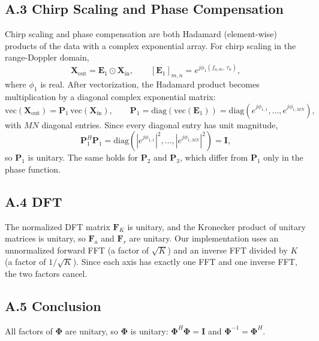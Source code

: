 \documentclass[12pt]{article}
\begin{document}
\subsection*{A.3 Chirp Scaling and Phase Compensation}
Chirp scaling and phase compensation are both Hadamard (element-wise)
products of the data with a complex exponential array. For chirp scaling in
the range-Doppler domain,
\begin{equation*}
  \mathbf{X}_{\mathrm{out}} = \mathbf{E}_{1} \odot \mathbf{X}_{\mathrm{in}},
  \qquad [\mathbf{E}_{1}]_{m,n} = e^{j\phi_{1}(f_{a,m},\,\tau_{n})},
\end{equation*}
where $\phi_{1}$ is real. After vectorization, the Hadamard product becomes
multiplication by a diagonal complex exponential matrix:
\begin{equation*}
  \mathrm{vec}(\mathbf{X}_{\mathrm{out}})
    = \mathbf{P}_{1}\,\mathrm{vec}(\mathbf{X}_{\mathrm{in}}),
  \qquad
  \mathbf{P}_{1} = \mathrm{diag}\!\left(\mathrm{vec}(\mathbf{E}_{1})\right)
    = \mathrm{diag}\!\left(e^{j\phi_{1,1}}, \dots, e^{j\phi_{1,MN}}\right),
\end{equation*}
with $MN$ diagonal entries. Since every diagonal entry has unit magnitude,
\begin{equation*}
  \mathbf{P}_{1}^{H}\mathbf{P}_{1}
    = \mathrm{diag}\!\left(|e^{j\phi_{1,1}}|^{2}, \dots,
                           |e^{j\phi_{1,MN}}|^{2}\right)
    = \mathbf{I},
\end{equation*}
so $\mathbf{P}_{1}$ is unitary. The same holds for $\mathbf{P}_{2}$ and
$\mathbf{P}_{3}$, which differ from $\mathbf{P}_{1}$ only in the phase
function.

\subsection*{A.4 DFT}
The normalized DFT matrix $\mathbf{F}_{K}$ is unitary, and the Kronecker
product of unitary matrices is unitary, so $\mathbf{F}_{a}$ and
$\mathbf{F}_{r}$ are unitary. Our implementation uses an unnormalized
forward FFT (a factor of $\sqrt{K}$) and an inverse FFT divided by $K$ (a
factor of $1/\sqrt{K}$). Since each axis has exactly one FFT and one inverse
FFT, the two factors cancel.

\subsection*{A.5 Conclusion}
All factors of $\boldsymbol{\Phi}$ are unitary, so $\boldsymbol{\Phi}$ is
unitary: $\boldsymbol{\Phi}^{H}\boldsymbol{\Phi} = \mathbf{I}$ and
$\boldsymbol{\Phi}^{-1} = \boldsymbol{\Phi}^{H}$.
\end{document}

